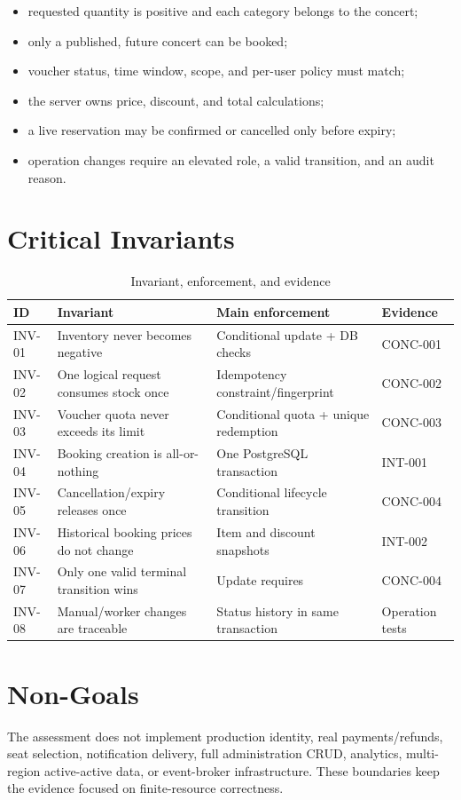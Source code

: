 \begin{itemize}[leftmargin=*]
  \item requested quantity is positive and each category belongs to the concert;
  \item only a published, future concert can be booked;
  \item voucher status, time window, scope, and per-user policy must match;
  \item the server owns price, discount, and total calculations;
  \item a live reservation may be confirmed or cancelled only before expiry;
  \item operation changes require an elevated role, a valid transition, and an audit reason.
\end{itemize}

\section{Critical Invariants}
\begin{table}[H]
\centering
\small
\caption{Invariant, enforcement, and evidence}
\begin{tabularx}{\textwidth}{p{}p{}p{}Y}
\toprule
\textbf{ID} & \textbf{Invariant} & \textbf{Main enforcement} & \textbf{Evidence} \\
\midrule
INV-01 & Inventory never becomes negative & Conditional update + DB checks & CONC-001 \\
INV-02 & One logical request consumes stock once & Idempotency constraint/fingerprint & CONC-002 \\
INV-03 & Voucher quota never exceeds its limit & Conditional quota + unique redemption & CONC-003 \\
INV-04 & Booking creation is all-or-nothing & One PostgreSQL transaction & INT-001 \\
INV-05 & Cancellation/expiry releases once & Conditional lifecycle transition & CONC-004 \\
INV-06 & Historical booking prices do not change & Item and discount snapshots & INT-002 \\
INV-07 & Only one valid terminal transition wins & Update requires  & CONC-004 \\
INV-08 & Manual/worker changes are traceable & Status history in same transaction & Operation tests \\
\bottomrule
\end{tabularx}
\end{table}

\section{Non-Goals}
The assessment does not implement production identity, real payments/refunds,
seat selection, notification delivery, full administration CRUD, analytics,
multi-region active-active data, or event-broker infrastructure. These
boundaries keep the evidence focused on finite-resource correctness.

